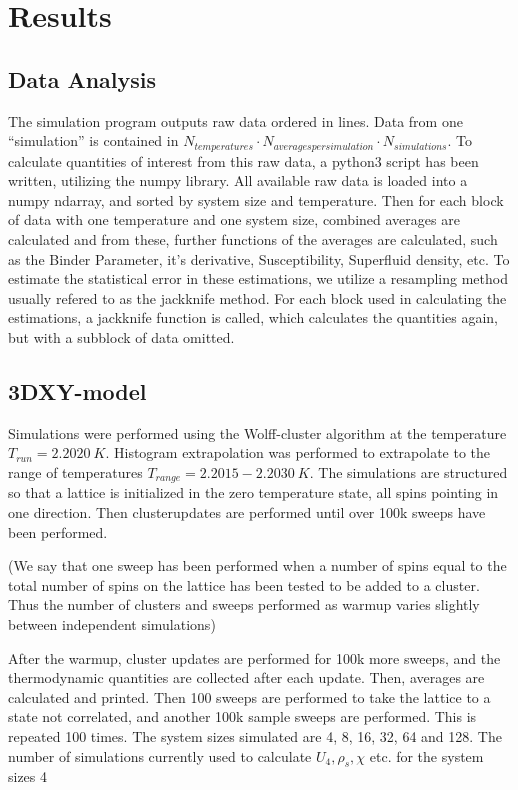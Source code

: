 \documentclass[a4paper]{article}
\begin{document}
\section{Results}
\subsection{Data Analysis}
The simulation program outputs raw data ordered in lines. Data from one ``simulation'' is contained in $N_{temperatures} \cdot N_{averages per simulation} \cdot N_{simulations}$.
To calculate quantities of interest from this raw data, a python3 script has been written, utilizing the numpy library. All available raw data is loaded into a numpy ndarray, and sorted by system size and temperature. Then for each block of data with one temperature and one system size, combined averages are calculated and from these, further functions of the averages are calculated, such as the Binder Parameter, it's derivative, Susceptibility, Superfluid density, etc. To estimate the statistical error in these estimations, we utilize a resampling method usually refered to as the jackknife method. For each block used in calculating the estimations, a jackknife function is called, which calculates the quantities again, but with a subblock of data omitted.
\subsection{3DXY-model}
Simulations were performed using the Wolff-cluster algorithm at the temperature $T_{run} = 2.2020~K$. Histogram extrapolation was performed to extrapolate to the range of temperatures $T_{range} = 2.2015-2.2030 ~ K$.
The simulations are structured so that a lattice is initialized in the zero temperature state, all spins pointing in one direction. Then clusterupdates are performed until over 100k sweeps have been performed.

(We say that one sweep has been performed when a number of spins equal to the total number of spins on the lattice has been tested to be added to a cluster.
Thus the number of clusters and sweeps performed as warmup varies slightly between independent simulations)

After the warmup, cluster updates are performed for 100k more sweeps, and the thermodynamic quantities are collected after each update. Then, averages are calculated and printed. Then 100 sweeps are performed to take the lattice to a state not correlated, and another 100k sample sweeps are performed. This is repeated 100 times. The system sizes simulated are 4, 8, 16, 32, 64 and 128. 
The number of simulations currently used to calculate $U_4, \rho_s, \chi $ etc. for the system sizes 4
\end{document}
